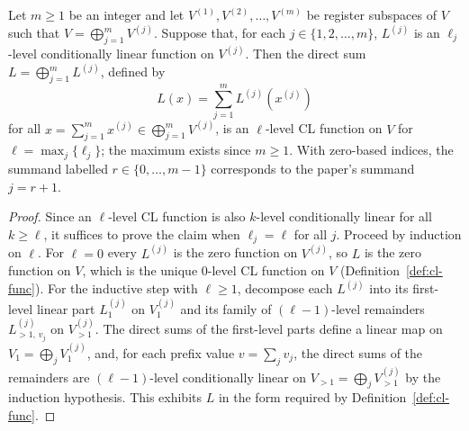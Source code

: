 \begin{lemma}\label{lem:cl-func-prod}
	\leanok
	Let $m \ge 1$ be an integer and let $V^{(1)}, V^{(2)}, \dots, V^{(m)}$ be register subspaces of $V$ such that $V = \bigoplus_{j=1}^m V^{(j)}$. Suppose that, for each $j \in \{1, 2, \dots, m\}$, $L^{(j)}$ is an $\ell_j$-level conditionally linear function on $V^{(j)}$. Then the direct sum $L = \bigoplus_{j=1}^m L^{(j)}$, defined by
	\[
		L(x) = \sum_{j=1}^m L^{(j)}(x^{(j)})
	\]
	for all $x = \sum_{j=1}^m x^{(j)} \in \bigoplus_{j=1}^m V^{(j)}$, is an $\ell$-level CL function on $V$ for $\ell = \max_j \{\ell_j\}$; the maximum exists since $m \ge 1$.
	With zero-based indices, the summand labelled $r\in\{0,\ldots,m-1\}$
	corresponds to the paper's summand $j=r+1$.
\end{lemma}
\begin{proof}
	\leanok
	Since an $\ell$-level CL function is also $k$-level conditionally linear for all $k \ge \ell$, it suffices to prove the claim when $\ell_j = \ell$ for all $j$. Proceed by induction on $\ell$. For $\ell = 0$ every $L^{(j)}$ is the zero function on $V^{(j)}$, so $L$ is the zero function on $V$, which is the unique $0$-level CL function on $V$ (Definition~\ref{def:cl-func}). For the inductive step with $\ell \ge 1$, decompose each $L^{(j)}$ into its first-level linear part $L^{(j)}_1$ on $V^{(j)}_1$ and its family of $(\ell-1)$-level remainders $L^{(j)}_{>1,\,v_j}$ on $V^{(j)}_{>1}$. The direct sums of the first-level parts define a linear map on $V_1 = \bigoplus_j V^{(j)}_1$, and, for each prefix value $v = \sum_j v_j$, the direct sums of the remainders are $(\ell-1)$-level conditionally linear on $V_{>1} = \bigoplus_j V^{(j)}_{>1}$ by the induction hypothesis. This exhibits $L$ in the form required by Definition~\ref{def:cl-func}.
\end{proof}

